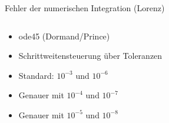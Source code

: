 \documentclass[notheorems,hidelinks,aspectratio=1610]{beamer}
\begin{document}
\begin{frame}{Fehler der numerischen Integration (Lorenz)}
  \begin{columns}
    \begin{column}{.4\textwidth}
      \begin{itemize}
        \item ode45 (Dormand/Prince)
        \item Schrittweitensteuerung über Toleranzen
        \item Standard: $10^{-3}$ und $10^{-6}$
        \item Genauer mit $10^{-4}$ und $10^{-7}$
        \item<2-> Genauer mit $10^{-5}$ und $10^{-8}$
      \end{itemize}
    \end{column}
    \begin{column}{.6\textwidth}

\end{column}
\end{columns}
\end{frame}
\end{document}
